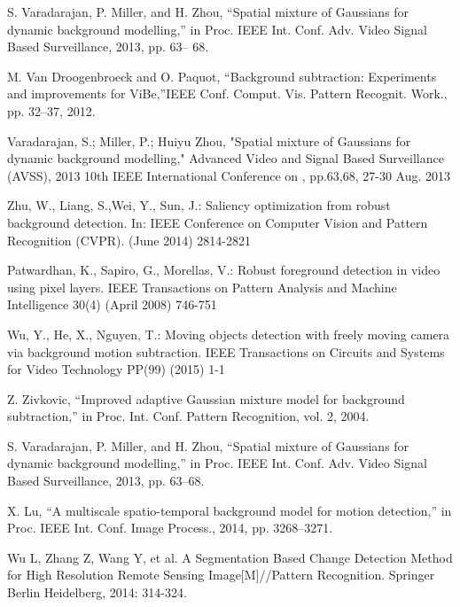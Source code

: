 \documentclass[runningheads,a4paper]{llncs}
\begin{document}
\begin{thebibliography}{4}
 S. Varadarajan, P. Miller, and H.
    Zhou, “Spatial mixture of Gaussians for dynamic background modelling,” in
    Proc. IEEE Int. Conf. Adv. Video Signal Based Surveillance, 2013, pp. 63–
    68.

 M. Van Droogenbroeck and O. Paquot, “Background
    subtraction: Experiments and improvements for ViBe,”IEEE Conf. Comput. Vis.
    Pattern Recognit. Work., pp. 32–37, 2012.

 Varadarajan, S.; Miller, P.; Huiyu Zhou,
    "Spatial mixture of Gaussians for dynamic background modelling," Advanced
    Video and Signal Based Surveillance (AVSS), 2013 10th IEEE International
    Conference on , pp.63,68, 27-30 Aug. 2013

 Zhu, W., Liang, S.,Wei, Y., Sun, J.:
    Saliency optimization from robust background detection. In: IEEE Conference
    on Computer Vision and Pattern Recognition (CVPR). (June 2014) 2814-2821

 Patwardhan, K., Sapiro, G.,
    Morellas, V.: Robust foreground detection in video using pixel layers. IEEE
    Transactions on Pattern Analysis and Machine Intelligence 30(4) (April
    2008) 746-751

 Wu, Y., He, X., Nguyen, T.: Moving objects
    detection with freely moving camera via background motion subtraction. IEEE
    Transactions on Circuits and Systems for Video Technology PP(99) (2015) 1-1

 Z. Zivkovic, “Improved adaptive Gaussian mixture model
    for background subtraction,” in Proc. Int. Conf. Pattern Recognition, vol.
    2, 2004.

 S. Varadarajan, P. Miller, and H. Zhou, “Spatial
    mixture of Gaussians for dynamic background modelling,” in Proc. IEEE Int.
    Conf. Adv. Video Signal Based Surveillance, 2013, pp. 63–68.

 X. Lu, “A multiscale spatio-temporal background model
    for motion detection,” in Proc. IEEE Int. Conf. Image Process., 2014, pp.
    3268–3271.

 Wu L, Zhang Z, Wang Y, et al. A Segmentation Based
    Change Detection Method for High Resolution Remote Sensing
    Image[M]//Pattern Recognition. Springer Berlin Heidelberg, 2014: 314-324.


\end{thebibliography}
\end{document}
